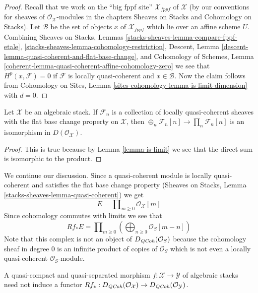 \begin{proof}
Recall that we work on the ``big fppf site'' $\mathcal{X}_{fppf}$
of $\mathcal{X}$ (by our conventions
for sheaves of $\mathcal{O}_\mathcal{X}$-modules in the chapters
Sheaves on Stacks and Cohomology on Stacks). Let $\mathcal{B}$ be the set
of objects $x$ of $\mathcal{X}_{fppf}$ which lie over an affine scheme $U$. 
Combining
Sheaves on Stacks, Lemmas
\ref{stacks-sheaves-lemma-compare-fppf-etale},
\ref{stacks-sheaves-lemma-cohomology-restriction},
Descent, Lemma \ref{descent-lemma-quasi-coherent-and-flat-base-change},
and
Cohomology of Schemes, Lemma
\ref{coherent-lemma-quasi-coherent-affine-cohomology-zero}
we see that $H^p(x, \mathcal{F}) = 0$ if $\mathcal{F}$ is
locally quasi-coherent and $x \in \mathcal{B}$.
Now the claim follows from
Cohomology on Sites, Lemma \ref{sites-cohomology-lemma-is-limit-dimension}
with $d = 0$.
\end{proof}

\begin{lemma}
\label{lemma-sum-is-product}
Let $\mathcal{X}$ be an algebraic stack. If $\mathcal{F}_n$ is a collection
of locally quasi-coherent sheaves with the flat base change property on
$\mathcal{X}$, then $\oplus_n \mathcal{F}_n[n] \to \prod_n \mathcal{F}_n[n]$
is an isomorphism in $D(\mathcal{O}_\mathcal{X})$.
\end{lemma}

\begin{proof}
This is true because by Lemma \ref{lemma-is-limit} we see that the direct sum
is isomorphic to the product.
\end{proof}

\noindent
We continue our discussion. Since a quasi-coherent module is locally
quasi-coherent and satisfies the flat base change property
(Sheaves on Stacks, Lemma \ref{stacks-sheaves-lemma-quasi-coherent}) we get
$$
E = \prod\nolimits_{m \geq 0} \mathcal{O}_\mathcal{X}[m]
$$
Since cohomology commutes
with limits we see that
$$
Rf_*E = \prod\nolimits_{m \geq 0}
\left(\bigoplus\nolimits_{n \geq 0} \mathcal{O}_S[m - n]\right)
$$
Note that this complex is not an object of $D_{\mathit{QCoh}}(\mathcal{O}_S)$
because the cohomology sheaf in degree $0$ is an infinite product of copies
of $\mathcal{O}_S$ which is not even a locally quasi-coherent
$\mathcal{O}_S$-module.

\begin{lemma}
\label{lemma-push-not-OK}
A quasi-compact and quasi-separated morphism
$f : \mathcal{X} \to \mathcal{Y}$ of algebraic stacks
need not induce a functor
$Rf_* : D_{\mathit{QCoh}}(\mathcal{O}_\mathcal{X}) \to
D_{\mathit{QCoh}}(\mathcal{O}_\mathcal{Y})$.
\end{lemma}

